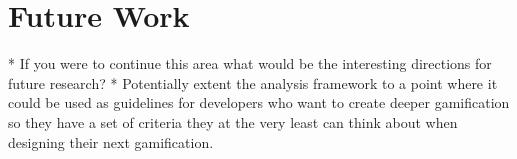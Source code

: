 \section{Future Work}
* If you were to continue this area what would be the interesting directions for future research?
* Potentially extent the analysis framework to a point where it could be used as guidelines for developers who want to create deeper gamification so they have a set of criteria they at the very least can think about when designing their next gamification. 